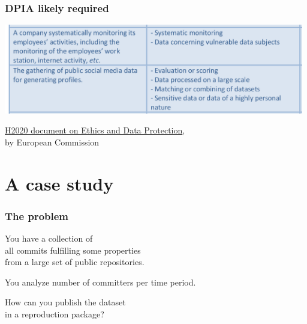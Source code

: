 \documentclass[17pt,aspectratio=169,hyperref={pdfusetitle,colorlinks,allcolors=olive}]{beamer}
\begin{document}
\begin{frame}[fragile]
  \frametitle{DPIA likely required}

\begin{center}
  \includegraphics[height=3.9cm]{figs/gdpr-dpia-examples}
  \end{center}  
  
  {\footnotesize
    \begin{flushright}
    \href{https://ec.europa.eu/research/participants/data/ref/h2020/grants_manual/hi/ethics/h2020_hi_ethics-data-protection_en.pdf}{H2020 document on Ethics and Data Protection}, \\ by European Commission
  \end{flushright}
  }
\end{frame}




\section{A case study}

\begin{frame}[fragile]
  \frametitle{The problem}

  You have a collection of \\
  all commits fulfilling some properties \\
  from a large set of public repositories. \\

  \vspace{.3cm}
  
  You analyze number of committers per time period.

  \vspace{.3cm}

  How can you publish the dataset \\
  in a reproduction package? \\
\end{frame}
\end{document}

